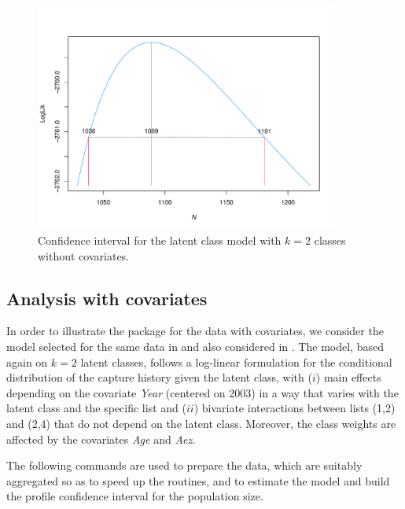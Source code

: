\begin{figure}\centering
\includegraphics[width=10cm]{example_meningits_plot1.pdf}
\caption{Confidence interval for the latent class model with $k=2$ classes without covariates.}\label{fig:CI1}
\end{figure}

\subsection{Analysis with covariates}

In order to illustrate the package for the data with covariates, we consider the model selected for the same data in \cite{bartolucci2018latent} and also considered in \cite{bartolucci2024estimating}.
The model, based again on $k=2$ latent classes, follows a log-linear formulation for the conditional distribution of the capture history given the latent class, with ($i$) main effects depending on the covariate {\em Year} (centered on 2003) in a way that varies with the latent class and the specific list and ($ii$) bivariate interactions between lists (1,2) and (2,4) that do not depend on the latent class.
Moreover, the class weights are affected by the covariates {\em Age} and {\em Aez}.

The following commands are used to prepare the data, which are suitably aggregated so as to speed up the routines, and to estimate the model and build the profile confidence interval for the population size.

